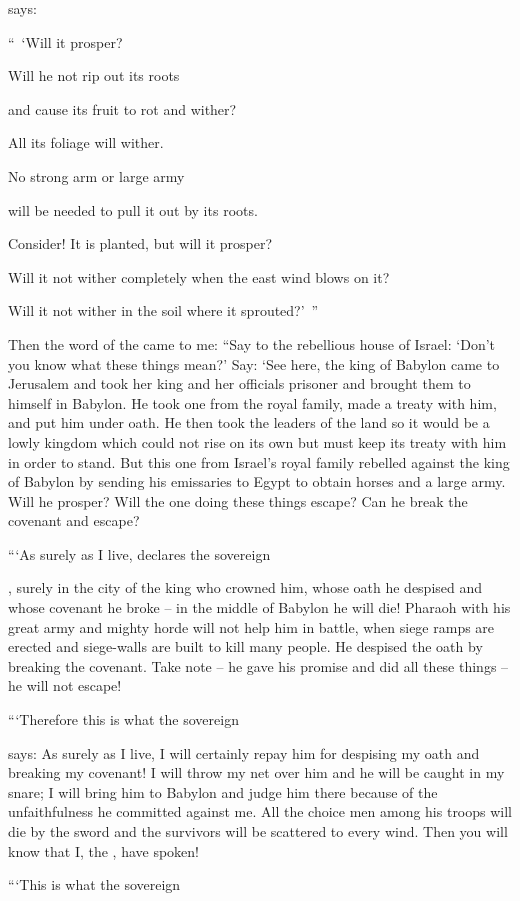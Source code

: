{{}
says:
\par }{\Q “ ‘Will it prosper?
\par }{\Q Will he not
rip out
its roots
\par }{\Q and cause its fruit
to rot
and wither?
\par }{\Q All
its foliage
will wither.
\par }{\Q No
strong
arm
or large
army
\par }{\Q will be needed to pull
it out
by its roots.
\par }{\Q {}Consider! It is planted,
but will it prosper?
\par }{\Q Will it not
wither completely
when the east
wind
blows
on
it?
\par }{\Q Will it not wither
in the soil
where it sprouted?’ ”
\par }{\PP {}Then
the word
of the {}
came to me:
“Say
to the rebellious
house
of Israel: ‘Don’t
you know
what
these
things mean?’ Say: ‘See here,
the king
of Babylon
came
to Jerusalem
and took
her king
and her officials
prisoner and brought
them to
himself in Babylon.
He took
one from the royal
family,
made
a treaty
with
him, and put
him under oath.
He then took
the leaders
of the land
so it would be a lowly
kingdom
which could not
rise
on its own but must keep
its treaty
with him in order to stand.
But this one from Israel’s royal family rebelled
against the king of Babylon by sending
his emissaries
to Egypt
to obtain
horses
and a large
army.
Will he prosper? Will the one
doing
these
things escape? Can he break
the covenant
and escape?
\par }{\PP {}“‘As surely as I
live,
declares
the sovereign

{}, surely
in the city
of the
king
who crowned
him, whose
oath
he despised
and whose
covenant
he broke
– in
the middle
of Babylon
he will die!
Pharaoh
with his great
army
and mighty
horde
will not
help him in battle,
when siege
ramps
are erected and siege-walls
are built
to kill
many people.
He despised
the oath
by breaking
the covenant.
Take note –
he gave
his
promise and did
all
these things – he will not escape!
\par }{\PP {}“‘Therefore
this is what
the sovereign

{}
says: As surely
as I
live, I will certainly
repay him for despising
my oath
and breaking
my covenant!
I
will throw
my net
over him and he will be caught
in my snare;
I will bring
him to Babylon
and judge
him
there
because of the unfaithfulness he committed against me.
All
the choice men
among his troops
will die
by the sword
and the survivors
will be scattered
to every
wind.
Then you will know
that
I,
the {},
have spoken!
\par }{\PP {}“‘This is what
the sovereign

}
